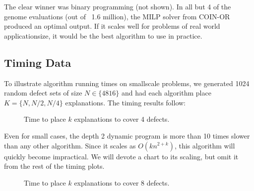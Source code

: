 The clear winner was binary programming (not shown).  In all but 4 of the genome evaluations (out of ~1.6 million), the MILP solver from COIN-OR produced an optimal output.  If it scales well for problems of real world applicationsize, it would be the best algorithm to use in practice.

\FloatBarrier

\subsection{Timing Data}

To illustrate algorithm running times on smallscale problems, we generated 1024 random defect sets of size $N \in \{4 8 16\}$ and had each algorithm place $K = \{ N, N/2, N/4\}$ explanations.  The timing results follow:

\begin{figure}[ht!] \centering
  \caption{Time to place $k$ explanations to cover 4 defects.}
\end{figure}
\FloatBarrier

Even for small cases, the depth 2 dynamic program is more than 10 times slower than any other algorithm.  Since it scales as $O(kn^{2+k})$, this algorithm will quickly become impractical.  We will devote a chart to its scaling, but omit it from the rest of the timing plots.

\begin{figure}[ht!] \centering
  \caption{Time to place $k$ explanations to cover 8 defects.}
\end{figure}

